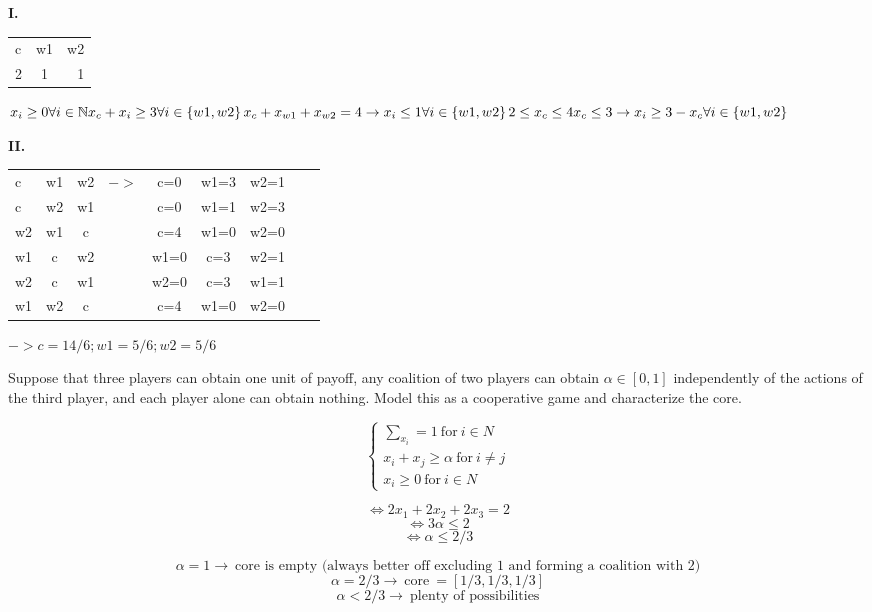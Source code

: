 \documentclass[../main.tex]{subfiles}
\begin{document}
\begin{solution}

\textbf{I.}

\begin{tabular}{ l | c |r }
  c & w1 & w2 \\
  2 & 1 & 1 \\
\end{tabular}

$x_i \geq 0 \forall i \in \mathbb{N} \newline
x_c + x_i \geq 3 \forall i \in \left\{w1, w2\right\} \newline
x_c + x_{w1} + x_{w2} = 4 \newline
\rightarrow \newline
x_i \leq 1 \forall i \in \left\{w1,w2\right\} \newline
2 \leq x_c \leq 4 \newline
x_c \leq 3 \rightarrow x_i \geq 3-x_c \forall i \in \left\{w1,w2\right\}$

\textbf{II.}

\begin{tabular}{ l c c c c c c c c }
  c & w1 & w2 & $->$ & c=0 & w1=3 & w2=1\\
  c & w2 & w1 &      & c=0 & w1=1 & w2=3\\
  w2 & w1 & c &      & c=4 & w1=0 & w2=0\\
  w1 & c & w2 &      & w1=0 & c=3 & w2=1\\
  w2 & c & w1 &      & w2=0 & c=3 & w1=1\\
  w1 & w2 & c &      & c=4 & w1=0 & w2=0\\
\end{tabular}

$-> c = 14/6; w1 = 5/6; w2 = 5/6$
\end{solution}

\begin{question}
Suppose that three players can obtain one unit of payoff, any coalition of two players can obtain $\alpha \in [0,1]$ independently of the actions of the third player, and each player alone can obtain nothing. Model this as a cooperative game and characterize the core.
\end{question}

\begin{solution}
\begin{equation}
 \begin{cases}
    \sum_{x_i} = 1 ~ \text{for} ~ i \in N\\
    x_i + x_j \geq \alpha ~ \text{for} ~ i \neq j\\
    x_i \geq 0 ~ \text{for} ~ i \in N
\end{cases}
\end{equation}

\[ \iff 2x_1 + 2x_2 + 2x_3 = 2 \]
\[ \iff 3\alpha \leq 2 \]
\[ \iff \alpha \leq 2/3 \]

\[ \alpha=1 \rightarrow ~ \text{core is empty (always better off excluding 1 and forming a coalition with 2)} \] 
\[ \alpha=2/3 \rightarrow ~ \text{core} ~ = [1/3, 1/3, 1/3] \]
\[ \alpha<2/3 \rightarrow ~ \text{plenty of possibilities} \]
\end{solution}
\end{document}
